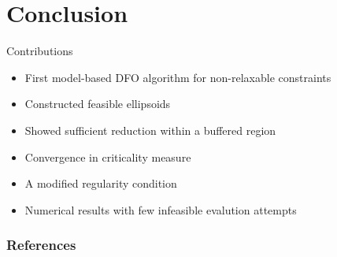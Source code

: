 \documentclass{beamer}
\begin{document}
\section{Conclusion}

\begin{frame}{Contributions}
	\begin{itemize}
		\setlength\itemsep{1.5em}
		\item First model-based DFO algorithm for non-relaxable constraints
		\item Constructed feasible ellipsoids
		\item Showed sufficient reduction within a buffered region
		\item Convergence in criticality measure
		\item A modified regularity condition
		\item Numerical results with few infeasible evalution attempts
	\end{itemize}
\end{frame}





\begin{frame}[allowframebreaks]
	\frametitle{References}
	
	
\end{frame}
\end{document}

